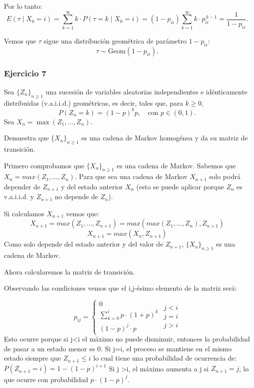Por lo tanto:
\[
E(\tau \mid X_0=i) = \sum_{k=1}^{\infty} k \cdot P(\tau=k \mid X_0=i) = (1-p_{ii}) \sum_{k=1}^{\infty} k \cdot p_{ii}^{\,k-1} = \frac{1}{1-p_{ii}}.
\]

Vemos que $\tau$ sigue una distribución geométrica de parámetro $1-p_{ii}$:
\[
\tau \sim \text{Geom}(1-p_{ii}).
\]


\subsubsection{Ejercicio 7}
\begin{exercise}
Sea $\{Z_n\}_{n \geq 1}$ una sucesión de variables aleatorias independientes e idénticamente distribuidas (v.a.i.i.d.) geométricas, es decir, tales que, para $k \geq 0$,
\[
P(Z_n = k) = (1 - p)^k p, \quad \text{con } p \in (0,1).
\]
Sea $X_n = \max(Z_1, \dots, Z_n)$. 

Demuestra que $\{X_n\}_{n \geq 1}$ es una cadena de Markov homogénea y da su matriz de transición.
\end{exercise}

Primero comprobamos que $\{X_n\}_{n\geq 1}$ es una cadena de Markov. Sabemos que $X_n = max(Z_1, \dots, Z_n)$. Para que sea una cadena de Markov $X_{n+1}$ solo podrá depender de $Z_{n+1}$ y del estado anterior $X_n$ (esto se puede aplicar porque $Z_n$ es v.a.i.i.d. y $Z_{n+1}$ no depende de $Z_n$).

Si calculamos $X_{n+1}$ vemos que:
\[
X_{n+1}=max(Z_1,\dots,Z_{n+1})=max(max(Z_1,\dots,Z_n),Z_{n+1})
\]
\[
X_{n+1}=max(X_n,Z_{n+1})
\]
Como solo depende del estado anterior y del valor de $Z_{n+1}$, $\{X_n\}_{n\geq 1}$ es una cadena de Markov.

Ahora calcularemos la matriz de transición.

Observando las condiciones vemos que el i,j-ésimo elemento de la matriz será:

\[
p_{ij}=
\left\{
\begin{matrix}
    0  \\
    \sum_{k=0}^{i} p \cdot (1+p)^k \\
    (1-p)^j \cdot p
\end{matrix}
\right.
\begin{matrix}
    j < i \\
    j = i \\
    j > i
\end{matrix}
\]
Esto ocurre porque si j<i el máximo no puede disminuir, entonces la probabilidad de pasar a un estado menor es 0.
Si j=i, el proceso se mantiene en el mismo estado siempre que $Z_{n+1} \leq i$ lo cual tiene una probabilidad de ocurrencia de: $P(Z_{n+1}=i)=1-(1-p)^{i+1}$
Si j >i, el máximo aumenta a j si $Z_{n+1}=j$, lo que ocurre con probabilidad $p \cdot (1-p)^j$.


